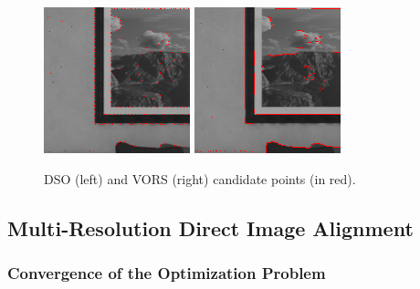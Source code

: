\begin{figure}[ht]
	\centering
	\includegraphics[width=0.49\linewidth]{assets/img/candidates-icl-dso-cropped.png}
	\hfill
	\includegraphics[width=0.49\linewidth]{assets/img/candidates-icl-vors-cropped.png}
	\caption{DSO (left) and VORS (right) candidate points (in red).}%
	\label{fig:candidates-dso-vors}
\end{figure}

\subsection{Multi-Resolution Direct Image Alignment}%
\label{sub:multi-res-direct-image-alignment}

\subsubsection{Convergence of the Optimization Problem}%
\label{ssub:convergence-optimization}


